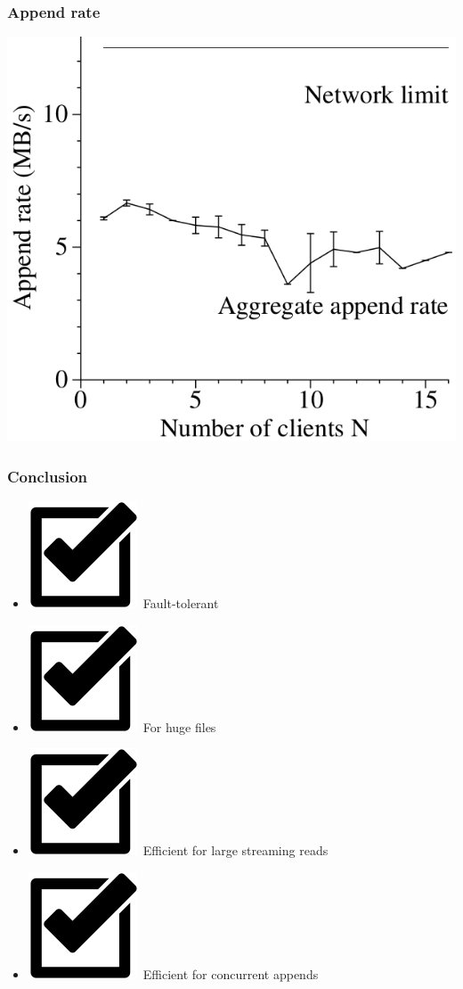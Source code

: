 \documentclass{beamer}
\begin{document}
\begin{frame}
 \frametitle{Append rate}
 \ratemehspace
 \includegraphics[height=\ratemesoption]{figures/GFSappends.png}
\end{frame}

\newcommand{\inccheck}{\includegraphics[scale=0.08]{figures/checkalvareduce.png}~}
\begin{frame}
 \frametitle{Conclusion}
 \begin{itemize}
  \item[] \inccheck Fault-tolerant
  \item[] \inccheck For huge files
  \item[] \inccheck Efficient for large streaming reads
  \item[] \inccheck Efficient for concurrent appends
 \end{itemize}
\end{frame}
\end{document}

